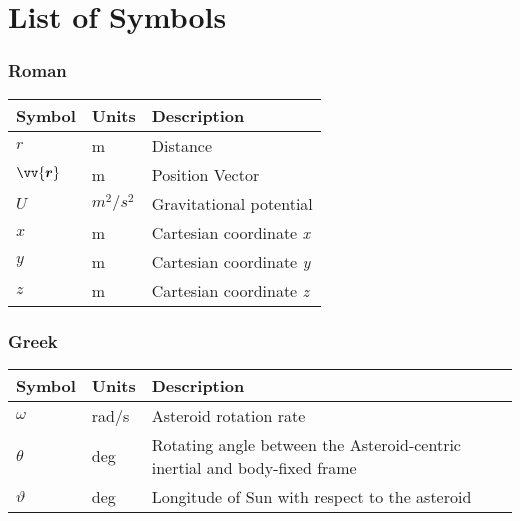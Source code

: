 \chapter*{List of Symbols}
\label{los}

\subsection*{Roman}
\begin{longtable}[l]{p{100pt} p{70pt} p{150pt}}
    \textbf{Symbol} & \textbf{Units} & \textbf{Description}                             \\
    \hline
    $r$              & m                & Distance                                      \\
    $\vv{\bm{r}}$    & m                & Position Vector                               \\
    $U$              & $m^2/s^2$        & Gravitational potential                       \\
    $x$              & m                & Cartesian coordinate \emph{x}                 \\
    $y$              & m                & Cartesian coordinate \emph{y}                 \\
    $z$              & m                & Cartesian coordinate \emph{z}                 \\
\end{longtable}
\vspace{1cm}

\subsection*{Greek}
\begin{longtable}[l]{p{100pt} p{70pt} p{150pt}}
    \textbf{Symbol} & \textbf{Units} & \textbf{Description}                             \\
    \hline
    $\omega$        & rad/s           & Asteroid rotation rate                          \\
    $\theta$        & deg             & Rotating angle between the Asteroid-centric
                                        inertial and body-fixed frame                   \\
    $\vartheta$     & deg             & Longitude of Sun with respect to the asteroid   \\
\end{longtable}
\vspace{1cm}

